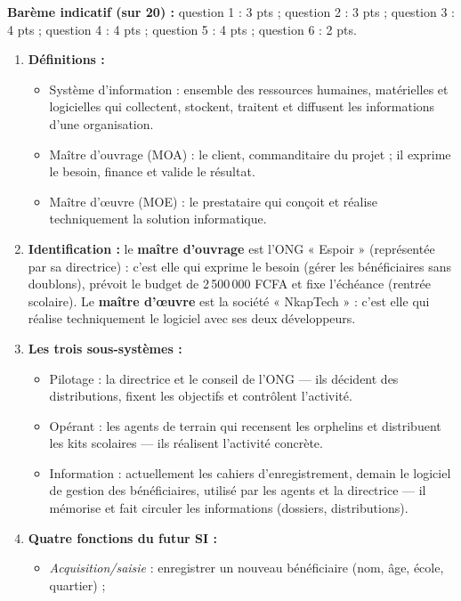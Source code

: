 \documentclass[11pt]{article}
\newcommand{\cle}[1]{{\popxbold\color{popdark}#1}}
\begin{document}
\begin{corrige}
\textbf{Barème indicatif (sur 20) :} question 1 : 3 pts ; question 2 : 3 pts ; question 3 : 4 pts ; question 4 : 4 pts ; question 5 : 4 pts ; question 6 : 2 pts.

\begin{enumerate}
  \item \textbf{Définitions :}
  \begin{itemize}
    \item \cle{Système d'information} : ensemble des ressources humaines, matérielles et logicielles qui collectent, stockent, traitent et diffusent les informations d'une organisation.
    \item \cle{Maître d'ouvrage} (MOA) : le client, commanditaire du projet ; il exprime le besoin, finance et valide le résultat.
    \item \cle{Maître d'œuvre} (MOE) : le prestataire qui conçoit et réalise techniquement la solution informatique.
  \end{itemize}
  \item \textbf{Identification :} le \textbf{maître d'ouvrage} est l'ONG « Espoir » (représentée par sa directrice) : c'est elle qui exprime le besoin (gérer les bénéficiaires sans doublons), prévoit le budget de 2\,500\,000 FCFA et fixe l'échéance (rentrée scolaire). Le \textbf{maître d'œuvre} est la société « NkapTech » : c'est elle qui réalise techniquement le logiciel avec ses deux développeurs.
  \item \textbf{Les trois sous-systèmes :}
  \begin{itemize}
    \item \cle{Pilotage} : la directrice et le conseil de l'ONG — ils décident des distributions, fixent les objectifs et contrôlent l'activité.
    \item \cle{Opérant} : les agents de terrain qui recensent les orphelins et distribuent les kits scolaires — ils réalisent l'activité concrète.
    \item \cle{Information} : actuellement les cahiers d'enregistrement, demain le logiciel de gestion des bénéficiaires, utilisé par les agents et la directrice — il mémorise et fait circuler les informations (dossiers, distributions).
  \end{itemize}
  \item \textbf{Quatre fonctions du futur SI :}
  \begin{itemize}
    \item \emph{Acquisition/saisie} : enregistrer un nouveau bénéficiaire (nom, âge, école, quartier) ;

\end{itemize}
\end{enumerate}
\end{corrige}
\end{document}
